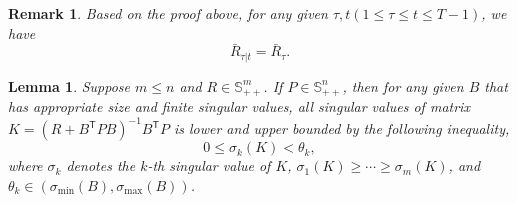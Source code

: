 \documentclass{article}
\newcommand{\transpose}{\mathsf{T}}
\newtheorem{lemma}{Lemma}
\newtheorem{remark}{Remark}
\begin{document}
\begin{remark}
    Based on the proof above, for any given $\tau,t(1\leq \tau \leq t \leq T-1)$, we have
    \begin{equation*}
        \bar{R}_{\tau|t} = \bar{R}_{\tau}.
    \end{equation*}
\end{remark}

\begin{lemma}\label{lemma:matrixK}
    Suppose $m \leq n$ and $R\in \mathbb{S}^{m}_{++}$. 
    If $P\in \mathbb{S}^{n}_{++}$, then for any given $B$ that has appropriate size and finite singular values, all singular values of matrix $K = (R+B^{\transpose}PB)^{-1}B^{\transpose}P$ is lower and upper bounded by the following inequality,
    \begin{equation}
        0 \leq \sigma_{k}(K) < \theta_{k},
    \end{equation}
    where $\sigma_{k}$ denotes the $k$-th singular value of $K$, $\sigma_{1}(K) \geq \cdots \geq \sigma_{m}(K)$, and $\theta_{k} \in (\sigma_{\min}(B),\sigma_{\max}(B))$.
\end{lemma}
\end{document}
